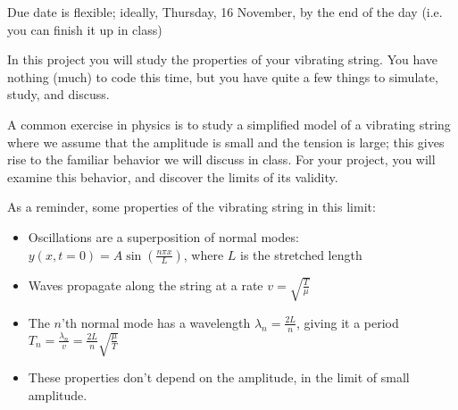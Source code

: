 \documentclass[12pt]{article}
\begin{document}
\Large
\centerline{}
\begin{center}
\large
Due date is flexible; ideally, Thursday, 16 November, by the end of the day (i.e. you can finish it up in class)
\end{center}
\normalsize


In this project you will study the properties of your vibrating string. You have nothing (much) to code this time, but you have quite a few things to simulate, study, and discuss.

A common exercise in physics is to study a simplified model of a vibrating string where we assume that the amplitude is small and 
the tension is large; this gives rise to the familiar behavior we will discuss in class. For your project, you will examine this behavior, and discover the limits of its validity.

As a reminder, some properties of the vibrating string in this limit:

\begin{itemize}
\item{Oscillations are a superposition of normal modes: $y(x,t=0) = A \sin \left(\frac{n\pi x}{L}\right)$, where $L$ is the stretched length}
\item{Waves propagate along the string at a rate $v=\sqrt {\frac{T}{\mu}}$}
\item{The $n$'th normal mode has a wavelength $\lambda_n=\frac{2L}{n}$, giving it a period $T_n=\frac{\lambda_n}{v}=\frac{2L}{n} \sqrt{  \frac{\mu}{T}}$}
\item{These properties don't depend on the amplitude, in the limit of small amplitude.}
\end{itemize}
\end{document}
